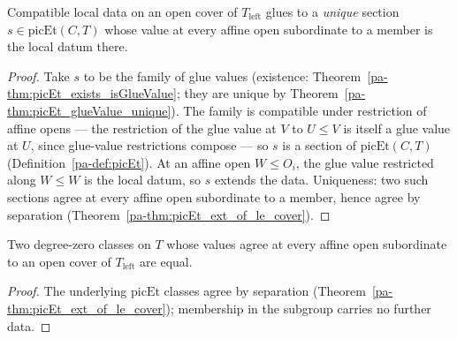 \begin{theorem}
  \label{pa-thm:picEt_existsUnique_glue_of_le_cover}
  \leanok

  Compatible local data on an open cover of \(T_{\mathrm{left}}\) glues to a \emph{unique}
  section \(s \in \mathrm{picEt}(C,T)\) whose value at every affine open subordinate to a
  member is the local datum there.
\end{theorem}
\begin{proof}
  \leanok
  Take \(s\) to be the family of glue values (existence:
  Theorem~\ref{pa-thm:picEt_exists_isGlueValue}; they are unique by
  Theorem~\ref{pa-thm:picEt_glueValue_unique}). The family is compatible under restriction of
  affine opens — the restriction of the glue value at \(V\) to \(U \le V\) is itself a glue
  value at \(U\), since glue-value restrictions compose — so \(s\) is a section of
  \(\mathrm{picEt}(C,T)\) (Definition~\ref{pa-def:picEt}). At an affine open \(W \le O_i\), the
  glue value restricted along \(W \le W\) is the local datum, so \(s\) extends the data.
  Uniqueness: two such sections agree at every affine open subordinate to a member, hence
  agree by separation (Theorem~\ref{pa-thm:picEt_ext_of_le_cover}).
\end{proof}

\begin{theorem}
  \label{pa-thm:pic0Subgroup_ext_of_le_cover}
  \leanok

  Two degree-zero classes on \(T\) whose values agree at every affine open subordinate to an
  open cover of \(T_{\mathrm{left}}\) are equal.
\end{theorem}
\begin{proof}
  \leanok
  The underlying \(\mathrm{picEt}\) classes agree by separation
  (Theorem~\ref{pa-thm:picEt_ext_of_le_cover}); membership in the subgroup carries no further
  data.
\end{proof}

